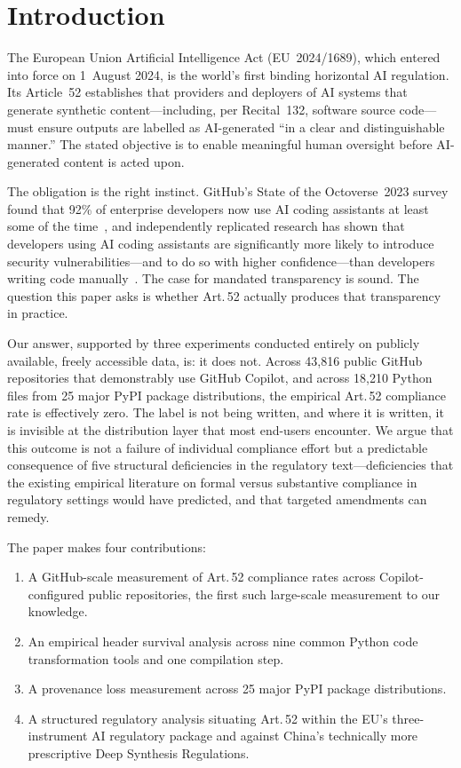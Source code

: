 \documentclass[conference]{IEEEtran}
\begin{document}
\section{Introduction}

The European Union Artificial Intelligence Act (EU~2024/1689), which
entered into force on 1~August 2024, is the world's first binding
horizontal AI regulation.  Its Article~52 establishes that providers
and deployers of AI systems that generate synthetic content---including,
per Recital~132, software source code---must ensure outputs are labelled
as AI-generated ``in a clear and distinguishable manner.''  The stated
objective is to enable meaningful human oversight before AI-generated
content is acted upon.

The obligation is the right instinct.  GitHub's State of the
Octoverse~2023 survey found that 92\% of enterprise developers now use
AI coding assistants at least some of the time~\cite{github2023}, and
independently replicated research has shown that developers using AI
coding assistants are significantly more likely to introduce security
vulnerabilities---and to do so with higher confidence---than developers
writing code manually~\cite{perry2023}.  The case for mandated
transparency is sound.  The question this paper asks is whether
Art.\,52 actually produces that transparency in practice.

Our answer, supported by three experiments conducted entirely on
publicly available, freely accessible data, is: it does not.  Across
43,816 public GitHub repositories that demonstrably use GitHub Copilot,
and across 18,210 Python files from 25 major PyPI package distributions,
the empirical Art.\,52 compliance rate is effectively zero.  The label
is not being written, and where it is written, it is invisible at the
distribution layer that most end-users encounter.  We argue that this
outcome is not a failure of individual compliance effort but a
predictable consequence of five structural deficiencies in the
regulatory text---deficiencies that the existing empirical literature on
formal versus substantive compliance in regulatory settings would have
predicted, and that targeted amendments can remedy.

The paper makes four contributions:
\begin{enumerate}
\item A GitHub-scale measurement of Art.\,52 compliance rates across
      Copilot-configured public repositories, the first such
      large-scale measurement to our knowledge.
\item An empirical header survival analysis across nine common Python
      code transformation tools and one compilation step.
\item A provenance loss measurement across 25 major PyPI package
      distributions.
\item A structured regulatory analysis situating Art.\,52 within the
      EU's three-instrument AI regulatory package and against China's
      technically more prescriptive Deep Synthesis Regulations.
\end{enumerate}
\end{document}
